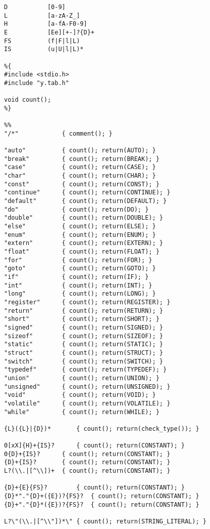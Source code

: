 \documentclass[a4paper,11pt]{article}
\theoremstyle{mytheor}
\begin{document}
\begin{lstlisting}[label={list:first},caption=LEX Code]
D			[0-9]
L			[a-zA-Z_]
H			[a-fA-F0-9]
E			[Ee][+-]?{D}+
FS			(f|F|l|L)
IS			(u|U|l|L)*

%{
#include <stdio.h>
#include "y.tab.h"

void count();
%}

%%
"/*"			{ comment(); }

"auto"			{ count(); return(AUTO); }
"break"			{ count(); return(BREAK); }
"case"			{ count(); return(CASE); }
"char"			{ count(); return(CHAR); }
"const"			{ count(); return(CONST); }
"continue"		{ count(); return(CONTINUE); }
"default"		{ count(); return(DEFAULT); }
"do"			{ count(); return(DO); }
"double"		{ count(); return(DOUBLE); }
"else"			{ count(); return(ELSE); }
"enum"			{ count(); return(ENUM); }
"extern"		{ count(); return(EXTERN); }
"float"			{ count(); return(FLOAT); }
"for"			{ count(); return(FOR); }
"goto"			{ count(); return(GOTO); }
"if"			{ count(); return(IF); }
"int"			{ count(); return(INT); }
"long"			{ count(); return(LONG); }
"register"		{ count(); return(REGISTER); }
"return"		{ count(); return(RETURN); }
"short"			{ count(); return(SHORT); }
"signed"		{ count(); return(SIGNED); }
"sizeof"		{ count(); return(SIZEOF); }
"static"		{ count(); return(STATIC); }
"struct"		{ count(); return(STRUCT); }
"switch"		{ count(); return(SWITCH); }
"typedef"		{ count(); return(TYPEDEF); }
"union"			{ count(); return(UNION); }
"unsigned"		{ count(); return(UNSIGNED); }
"void"			{ count(); return(VOID); }
"volatile"		{ count(); return(VOLATILE); }
"while"			{ count(); return(WHILE); }

{L}({L}|{D})*		{ count(); return(check_type()); }

0[xX]{H}+{IS}?		{ count(); return(CONSTANT); }
0{D}+{IS}?		{ count(); return(CONSTANT); }
{D}+{IS}?		{ count(); return(CONSTANT); }
L?(\\.|[^\\])+	{ count(); return(CONSTANT); }

{D}+{E}{FS}?		{ count(); return(CONSTANT); }
{D}*"."{D}+({E})?{FS}?	{ count(); return(CONSTANT); }
{D}+"."{D}*({E})?{FS}?	{ count(); return(CONSTANT); }

L?\"(\\.|[^\\"])*\"	{ count(); return(STRING_LITERAL); }


\end{lstlisting}
\end{document}
